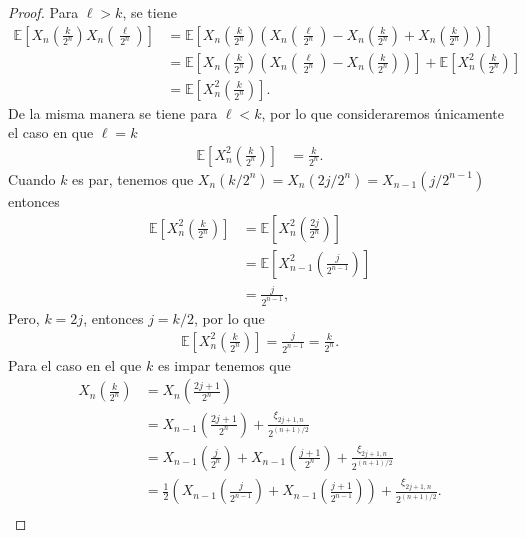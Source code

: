 \begin{proof}
Para $\ell > k$, se tiene
	\begin{align*}
		\mathbb{E} \left[ X_n \left( \frac{k}{2^n} \right) X_n \left( \frac{\ell}{2^n} \right) \right] & = \mathbb{E} \left[ X_n \left( \frac{k}{2^n} \right)  \left( X_n \left( \frac{\ell}{2^n} \right) - X_n \left( \frac{k}{2^n} \right) + X_n \left( \frac{k}{2^n} \right) \right) \right] \\
		& = \mathbb{E} \left[ X_n \left( \frac{k}{2^n} \right)  \left( X_n \left( \frac{\ell}{2^n} \right) - X_n \left( \frac{k}{2^n} \right) \right) \right] + \mathbb{E} \left[ X^2_n \left( \frac{k}{2^n} \right) \right] \\
		& = \mathbb{E} \left[ X^2_n \left( \frac{k}{2^n} \right) \right].
	\end{align*}
De la misma manera se tiene para $\ell < k$, por lo que consideraremos únicamente el caso en que $\ell = k$
	\begin{align*}
		\mathbb{E} \left[ X_n^2 \left( \frac{k}{2^n} \right) \right] & = \frac{k}{2^n}.
	\end{align*}
Cuando $k$ es par, tenemos que $X_n (k / 2^n) = X_n (2j / 2^n) = X_{n-1} (j / 2^{n-1})$ entonces
	\begin{align*}
		\mathbb{E} \left[ X_n^2 \left( \frac{k}{2^n} \right) \right] & = \mathbb{E} \left[ X_n^2 \left( \frac{2j}{2^n} \right) \right] \\
		& = \mathbb{E} \left[ X_{n-1}^2 \left( \frac{j}{2^{n-1}} \right) \right] \\
		& = \frac{j}{2^{n-1}},
	\end{align*}
Pero, $k = 2j$, entonces $j = k/2$, por lo que 
	\begin{align*}
		\mathbb{E} \left[ X_n^2 \left( \frac{k}{2^n} \right) \right] = \frac{j}{2^{n-1}} = \frac{k}{2^n}.
	\end{align*}
Para el caso en el que $k$ es impar tenemos que
	\begin{align*}
		X_n \left( \frac{k}{2^n} \right) & = X_n \left( \frac{2j + 1}{2^n} \right) \\
		& = X_{n-1} \left( \frac{2j + 1}{2^n} \right) + \frac{\xi_{2j+1, n}}{2^{(n+1)/2}} \\
		& = X_{n-1} \left( \frac{j}{2^n} \right) + X_{n-1} \left( \frac{j + 1}{2^n} \right) + \frac{\xi_{2j+1, n}}{2^{(n+1)/2}} \\
		& = \frac{1}{2} \left( X_{n-1} \left( \frac{j}{2^{n-1}} \right) + X_{n-1} \left( \frac{j + 1}{2^{n-1}} \right) \right) + \frac{\xi_{2j+1, n}}{2^{(n+1)/2}}. \\
	\end{align*}

\end{proof}
